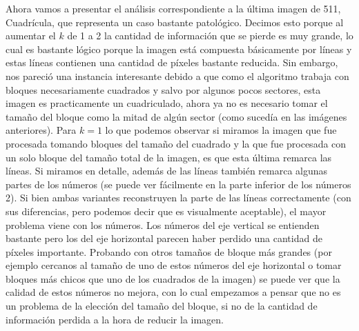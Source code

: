 \documentclass[a4paper]{article}
\begin{document}
Ahora vamos a presentar el análisis correspondiente a la última imagen de 511, Cuadrícula, que representa un caso bastante patológico. Decimos esto porque al aumentar el $k$ de 1 a 2 la cantidad de información que se pierde es muy grande, lo cual es bastante lógico porque la imagen está compuesta básicamente por líneas y estas líneas contienen una cantidad de píxeles bastante reducida. Sin embargo, nos pareció una instancia interesante debido a que como el algoritmo trabaja con bloques necesariamente cuadrados y salvo por algunos pocos sectores, esta imagen es practicamente un cuadriculado, ahora ya no es necesario tomar el tamaño del bloque como la mitad de algún sector (como sucedía en las imágenes anteriores). Para $k = 1$ lo que podemos observar si miramos la imagen que fue procesada tomando bloques del tamaño del cuadrado y la que fue procesada con un solo bloque del tamaño total de la imagen, es que esta última remarca las líneas. Si miramos en detalle, además de las líneas también remarca algunas partes de los números (se puede ver fácilmente en la parte inferior de los números 2). Si bien ambas variantes reconstruyen la parte de las líneas correctamente (con sus diferencias, pero podemos decir que es visualmente aceptable), el mayor problema viene con los números. Los números del eje vertical se entienden bastante pero los del eje horizontal parecen haber perdido una cantidad de píxeles importante. Probando con otros tamaños de bloque más grandes (por ejemplo cercanos al tamaño de uno de estos números del eje horizontal o tomar bloques más chicos que uno de los cuadrados de la imagen) se puede ver que la calidad de estos números no mejora, con lo cual empezamos a pensar que no es un problema de la elección del tamaño del bloque, si no de la cantidad de información perdida a la hora de reducir la imagen.
\end{document}
